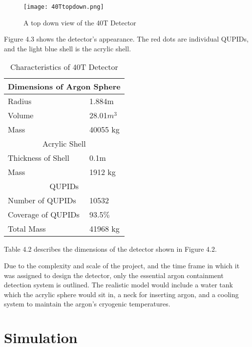 \documentclass[11pt,a4paper,oneside]{report}
\begin{document}
\begin{figure}[htb]
\centering
\texttt{[image: 40Ttopdown.png]}
\caption{A top down view of the 40T Detector}
\end{figure}

Figure 4.3 shows the detector's appearance. The red dots are individual QUPIDs, and the light blue shell is the acrylic shell. 

\begin{table}[h]
\caption{Characteristics of 40T Detector}
\begin{center}
    \begin{tabular}{ | l | l |}
    \hline
	\multicolumn{2}{|c|}{Dimensions of Argon Sphere} \\ \hline
	Radius & 1.884m \\ \hline
	Volume & 28.01$m^3$  \\ \hline
	Mass & 40055 kg \\ \hline
	\multicolumn{2}{|c|}{Acrylic Shell} \\ \hline
	Thickness of Shell & 0.1m \\ \hline
	Mass &  1912 kg \\ \hline
	\multicolumn{2}{|c|}{QUPIDs} \\ \hline
	Number of QUPIDs & 10532 \\ \hline
	Coverage of QUPIDs &93.5$\%$ \\ \hline \hline
	Total Mass & 41968 kg \\ \hline
    \hline
    \end{tabular}
\end{center}
\end{table}

Table 4.2 describes the dimensions of the detector shown in Figure 4.2. 

Due to the complexity and scale of the project, and the time frame in which it was assigned to design the detector, only the essential argon containment detection system is outlined. The realistic model would include a water tank which the acrylic sphere would sit in, a neck for inserting argon, and a cooling system to maintain the argon's cryogenic temperatures.



\chapter{Simulation}
\end{document}
